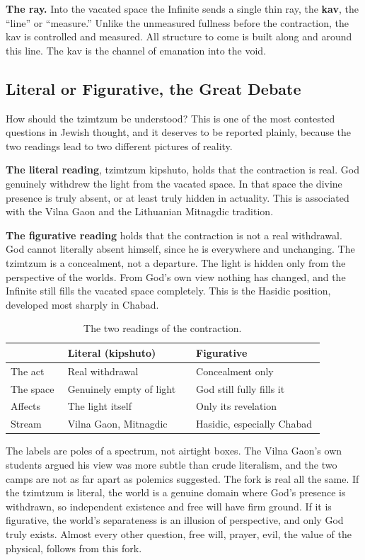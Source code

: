 \textbf{The ray.} Into the vacated space the Infinite sends a single thin ray, the
\textbf{kav}, the \enquote{line} or \enquote{measure.} Unlike the unmeasured fullness
before the contraction, the kav is controlled and measured. All structure to come is
built along and around this line. The kav is the channel of emanation into the void.

\subsection{Literal or Figurative, the Great Debate}

How should the tzimtzum be understood? This is one of the most contested questions in
Jewish thought, and it deserves to be reported plainly, because the two readings
lead to two different pictures of reality.

\textbf{The literal reading}, tzimtzum kipshuto, holds that the contraction is real.
God genuinely withdrew the light from the vacated space. In that space the divine
presence is truly absent, or at least truly hidden in actuality. This is associated
with the Vilna Gaon and the Lithuanian Mitnagdic tradition.

\textbf{The figurative reading} holds that the contraction is not a real withdrawal.
God cannot literally absent himself, since he is everywhere and unchanging. The
tzimtzum is a concealment, not a departure. The light is hidden only from the
perspective of the worlds. From God's own view nothing has changed, and the Infinite
still fills the vacated space completely. This is the Hasidic position, developed most
sharply in Chabad.

\begin{longtable}{L{0.16\linewidth} L{0.36\linewidth} L{0.36\linewidth}}
\caption{The two readings of the contraction.}\\
\toprule
 & \textbf{Literal (kipshuto)} & \textbf{Figurative} \\
\midrule
The act & Real withdrawal & Concealment only \\
The space & Genuinely empty of light & God still fully fills it \\
Affects & The light itself & Only its revelation \\
Stream & Vilna Gaon, Mitnagdic & Hasidic, especially Chabad \\
\bottomrule
\end{longtable}

The labels are poles of a spectrum, not airtight boxes. The Vilna Gaon's own students
argued his view was more subtle than crude literalism, and the two camps are not as
far apart as polemics suggested. The fork is real all the same. If the tzimtzum is
literal, the world is a genuine domain where God's presence is withdrawn, so
independent existence and free will have firm ground. If it is figurative, the
world's separateness is an illusion of perspective, and only God truly exists. Almost
every other question, free will, prayer, evil, the value of the physical, follows
from this fork.

